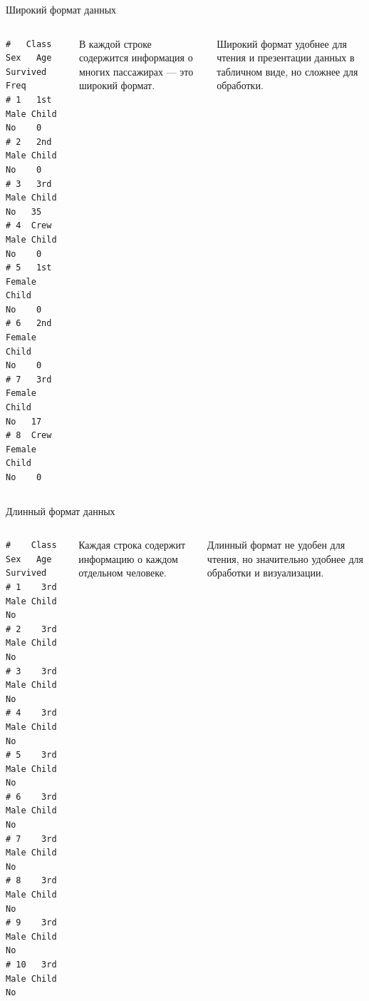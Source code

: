 \documentclass[
  10pt,
  ignorenonframetext,
  aspectratio=169,t,xcolor=table]{beamer}
\newcommand{\columnsbegin}{\vspace{-0.5\baselineskip}\begin{columns}[t,onlytextwidth]}
\newcommand{\columnsend}{\end{columns}}
\begin{document}
\begin{frame}[fragile]{Широкий формат данных}
\protect\hypertarget{ux448ux438ux440ux43eux43aux438ux439-ux444ux43eux440ux43cux430ux442-ux434ux430ux43dux43dux44bux445}{}
\columnsbegin
{}

\begin{verbatim}
#   Class    Sex   Age Survived Freq
# 1   1st   Male Child       No    0
# 2   2nd   Male Child       No    0
# 3   3rd   Male Child       No   35
# 4  Crew   Male Child       No    0
# 5   1st Female Child       No    0
# 6   2nd Female Child       No    0
# 7   3rd Female Child       No   17
# 8  Crew Female Child       No    0
\end{verbatim}


\vspace{3\baselineskip}

В каждой строке содержится информация о многих пассажирах --- это
широкий формат.

Широкий формат удобнее для чтения и презентации данных в табличном виде,
но сложнее для обработки.

\columnsend
\end{frame}

\begin{frame}[fragile]{Длинный формат данных}
\protect\hypertarget{ux434ux43bux438ux43dux43dux44bux439-ux444ux43eux440ux43cux430ux442-ux434ux430ux43dux43dux44bux445}{}
\columnsbegin
{}

\begin{verbatim}
#    Class  Sex   Age Survived
# 1    3rd Male Child       No
# 2    3rd Male Child       No
# 3    3rd Male Child       No
# 4    3rd Male Child       No
# 5    3rd Male Child       No
# 6    3rd Male Child       No
# 7    3rd Male Child       No
# 8    3rd Male Child       No
# 9    3rd Male Child       No
# 10   3rd Male Child       No
\end{verbatim}


\vspace{3\baselineskip}

Каждая строка содержит информацию о каждом отдельном человеке.

Длинный формат не удобен для чтения, но значительно удобнее для
обработки и визуализации.

\columnsend
\end{frame}

\begin{frame}
\end{frame}
\end{document}
